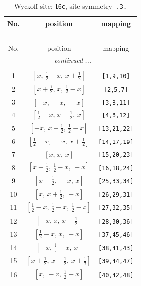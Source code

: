 \documentclass[fleqn,8pt]{jsarticle}
\begin{document}
\begin{longtable}{ccc}
\caption{Wyckoff site: {\tt 16c}, site symmetry: {\tt .3.}}
 \\
 \hline \hline
No. & position & mapping \\ \hline \endfirsthead

\multicolumn{2}{l}{\tablename\ \thetable{}} \\
 \hline \hline
No. & position & mapping \\ \hline \endhead

 \hline \hline
\multicolumn{2}{r}{\footnotesize\it continued ...} \\ \endfoot

 \hline \hline
\multicolumn{2}{r}{} \\ \endlastfoot

1 & $\left[ x,\, \frac{1}{2} - x,\, x + \frac{1}{2} \right]$ & {\tt [1,9,10]} \\ \hline
2 & $\left[ x + \frac{1}{2},\, x,\, \frac{1}{2} - x \right]$ & {\tt [2,5,7]} \\ \hline
3 & $\left[ - x,\, - x,\, - x \right]$ & {\tt [3,8,11]} \\ \hline
4 & $\left[ \frac{1}{2} - x,\, x + \frac{1}{2},\, x \right]$ & {\tt [4,6,12]} \\ \hline
5 & $\left[ - x,\, x + \frac{1}{2},\, \frac{1}{2} - x \right]$ & {\tt [13,21,22]} \\ \hline
6 & $\left[ \frac{1}{2} - x,\, - x,\, x + \frac{1}{2} \right]$ & {\tt [14,17,19]} \\ \hline
7 & $\left[ x,\, x,\, x \right]$ & {\tt [15,20,23]} \\ \hline
8 & $\left[ x + \frac{1}{2},\, \frac{1}{2} - x,\, - x \right]$ & {\tt [16,18,24]} \\ \hline
9 & $\left[ x + \frac{1}{2},\, - x,\, x \right]$ & {\tt [25,33,34]} \\ \hline
10 & $\left[ x,\, x + \frac{1}{2},\, - x \right]$ & {\tt [26,29,31]} \\ \hline
11 & $\left[ \frac{1}{2} - x,\, \frac{1}{2} - x,\, \frac{1}{2} - x \right]$ & {\tt [27,32,35]} \\ \hline
12 & $\left[ - x,\, x,\, x + \frac{1}{2} \right]$ & {\tt [28,30,36]} \\ \hline
13 & $\left[ \frac{1}{2} - x,\, x,\, - x \right]$ & {\tt [37,45,46]} \\ \hline
14 & $\left[ - x,\, \frac{1}{2} - x,\, x \right]$ & {\tt [38,41,43]} \\ \hline
15 & $\left[ x + \frac{1}{2},\, x + \frac{1}{2},\, x + \frac{1}{2} \right]$ & {\tt [39,44,47]} \\ \hline
16 & $\left[ x,\, - x,\, \frac{1}{2} - x \right]$ & {\tt [40,42,48]} \\
\end{longtable}
\end{document}
